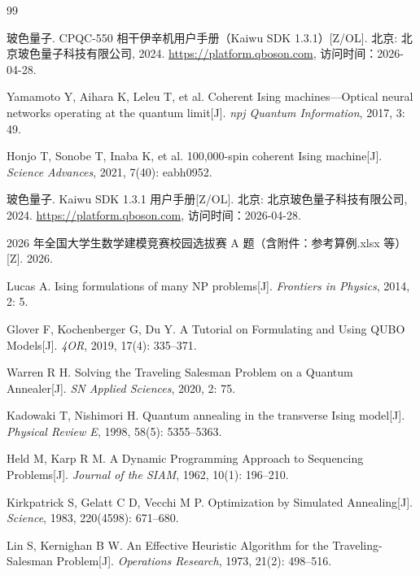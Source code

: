 \documentclass[UTF8,12pt,a4paper]{ctexart}
\begin{document}
\begin{thebibliography}{99}

 玻色量子. CPQC-550 相干伊辛机用户手册（Kaiwu SDK 1.3.1）[Z/OL]. 北京: 北京玻色量子科技有限公司, 2024. \url{https://platform.qboson.com}, 访问时间：2026-04-28.

 Yamamoto Y, Aihara K, Leleu T, et al. Coherent Ising machines---Optical neural networks operating at the quantum limit[J]. \emph{npj Quantum Information}, 2017, 3: 49.

 Honjo T, Sonobe T, Inaba K, et al. 100,000-spin coherent Ising machine[J]. \emph{Science Advances}, 2021, 7(40): eabh0952.

 玻色量子. Kaiwu SDK 1.3.1 用户手册[Z/OL]. 北京: 北京玻色量子科技有限公司, 2024. \url{https://platform.qboson.com}, 访问时间：2026-04-28.

 2026 年全国大学生数学建模竞赛校园选拔赛 A 题（含附件：参考算例.xlsx 等）[Z]. 2026.

 Lucas A. Ising formulations of many NP problems[J]. \emph{Frontiers in Physics}, 2014, 2: 5.

 Glover F, Kochenberger G, Du Y. A Tutorial on Formulating and Using QUBO Models[J]. \emph{4OR}, 2019, 17(4): 335--371.

 Warren R H. Solving the Traveling Salesman Problem on a Quantum Annealer[J]. \emph{SN Applied Sciences}, 2020, 2: 75.

 Kadowaki T, Nishimori H. Quantum annealing in the transverse Ising model[J]. \emph{Physical Review E}, 1998, 58(5): 5355--5363.

 Held M, Karp R M. A Dynamic Programming Approach to Sequencing Problems[J]. \emph{Journal of the SIAM}, 1962, 10(1): 196--210.

 Kirkpatrick S, Gelatt C D, Vecchi M P. Optimization by Simulated Annealing[J]. \emph{Science}, 1983, 220(4598): 671--680.

 Lin S, Kernighan B W. An Effective Heuristic Algorithm for the Traveling-Salesman Problem[J]. \emph{Operations Research}, 1973, 21(2): 498--516.


\end{thebibliography}
\end{document}
